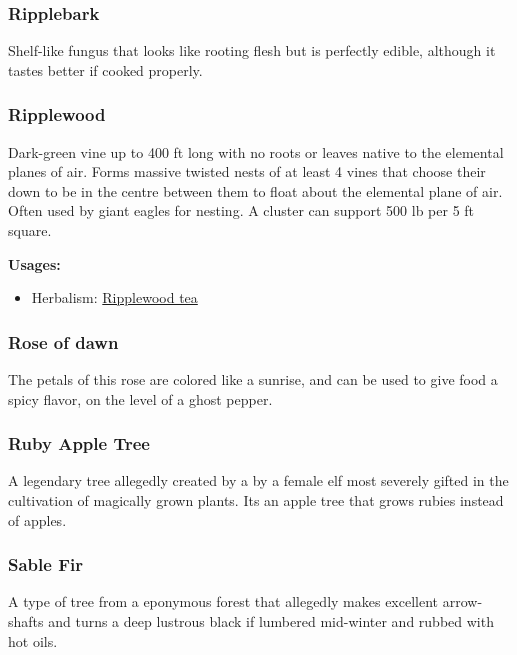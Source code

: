 \subsubsection{Ripplebark}

Shelf-like fungus that looks like rooting flesh but is perfectly edible, although it tastes better if cooked properly.

\subsubsection{Ripplewood}
\label{Ripplewood}

Dark-green vine up to 400 ft long with no roots or leaves native to the elemental planes of air. Forms massive twisted nests of at least 4 vines that choose their down to be in the centre between them to float about the elemental plane of air. Often used by giant eagles for nesting. A cluster can support 500 lb per 5 ft square.

\vspace{5mm}

\textbf{Usages:}

\begin{itemize}[noitemsep]
\item[] Herbalism: \hyperref[Ripplewood tea]{Ripplewood tea}
\end{itemize}

\subsubsection{Rose of dawn}
\label{rose_of_dawn}

The petals of this rose are colored like a sunrise, and can be used to give food a spicy flavor, on the level of a ghost pepper.

\subsubsection{Ruby Apple Tree}

A legendary tree allegedly created by a by a female elf most severely gifted in the cultivation of magically grown plants. Its an apple tree that grows rubies instead of apples.

\subsubsection{Sable Fir}

A type of tree from a eponymous forest that allegedly makes excellent arrow-shafts and turns a deep lustrous black if lumbered mid-winter and rubbed with hot oils.

